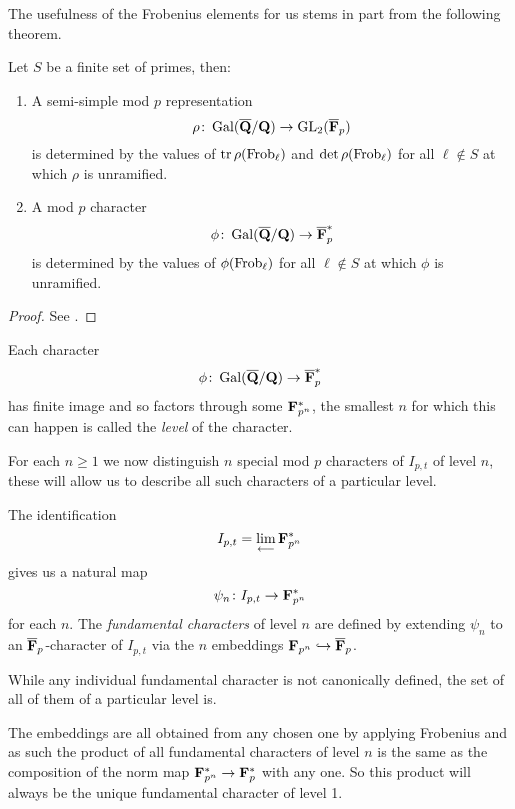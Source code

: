 \documentclass[a4paper,12pt]{article}
\begin{document}
The usefulness of the Frobenius elements for us stems in part from the following theorem.

\begin{thm}\label{thm:cheb}
Let $S$ be a finite set of primes, then:
\begin{enumerate}
\item A semi-simple mod $p$ representation
\[
\rho\colon \operatorname{Gal}(\overline{\mathbf{Q}}/\mathbf{Q}) \to \operatorname{GL}_2(\overline{\mathbf{F}}_p)
\]
is determined by the values of $\operatorname{tr}\rho(\operatorname{Frob}_\ell)$ and $\det\rho(\operatorname{Frob}_\ell)$ for all $\ell\not\in S$ at which $\rho$ is unramified.

\item A mod $p$ character
\[
\phi\colon \operatorname{Gal}(\overline{\mathbf{Q}}/\mathbf{Q}) \to \overline{\mathbf{F}}_p^*
\]
is determined by the values of $\phi(\operatorname{Frob}_\ell)$ for all $\ell\not\in S$ at which $\phi$ is unramified.
\end{enumerate}

\end{thm}
\begin{proof}
See \cite[prop. 25]{DDT}.
\end{proof}

\begin{defn}
Each character
\[
\phi \colon \operatorname{Gal}(\overline{\mathbf{Q}}/\mathbf{Q}) \to \overline{\mathbf{F}}_p^*
\]
has finite image and so factors through some $\mathbf{F}_{p^n}^*$, the smallest $n$ for which this can happen is called the \emph{level} of the character.
\end{defn}


For each $n \ge 1$ we now distinguish $n$ special mod $p$ characters of $I_{p,t}$ of level $n$, these will allow us to describe all such characters of a particular level.

\begin{defn}\label{def:fund}
The identification
\[
I_{p,t}  =  \lim_{\longleftarrow} \mathbf{F}_{p^n}^*
\]
gives us a natural map
\[
\psi_n\colon I_{p,t} \to \mathbf{F}_{p^n}^*
\]
for each $n$.
The \emph{fundamental characters} of level $n$ are defined by extending $\psi_n$ to an $\overline{\mathbf{F}}_p$-character of $I_{p,t}$ via the $n$ embeddings $\mathbf{F}_{p^n} \hookrightarrow \overline{\mathbf{F}}_p$.

While any individual fundamental character is not canonically defined, the set of all of them of a particular level is.
\end{defn}

\begin{rmk}\label{rmk:prodchar}
The embeddings are all obtained from any chosen one by applying Frobenius and as such the product of all fundamental characters of level $n$ is the same as the composition of the norm map $\mathbf{F}_{p^n}^* \to \mathbf{F}_p^*$ with any one.
So this product will always be the unique fundamental character of level 1.
\end{rmk}
\end{document}

